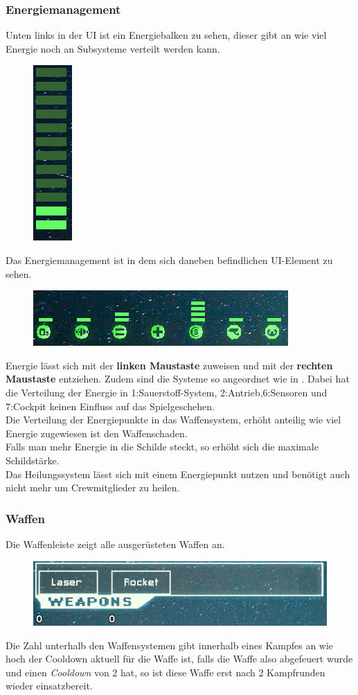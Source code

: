 \documentclass[fontsize=12pt,paper=a4,twoside]{scrartcl}
\begin{document}
\subsubsection{Energiemanagement} \label{sec:Energiemanagement}
Unten links in der UI ist ein Energiebalken zu sehen, dieser gibt an wie viel Energie noch an Subsysteme verteilt werden kann.
\begin{figure}[H]
\centering
\includegraphics[width=0.05\linewidth]{DasSpiel/Ui/power.png}
\end{figure}
Das Energiemanagement ist in dem sich daneben befindlichen UI-Element zu sehen.

\begin{figure}[H]
\centering
\includegraphics[width=0.7\linewidth]{DasSpiel/Ui/systems.png}
\end{figure} 

Energie lässt sich mit der \textbf{linken Maustaste} zuweisen und mit der \textbf{rechten Maustaste} entziehen.
Zudem sind die Systeme so angeordnet wie in . Dabei hat die Verteilung der Energie in 1:Sauerstoff-System, 2:Antrieb,6:Sensoren und 7:Cockpit keinen Einfluss auf das Spielgeschehen.
\\
Die Verteilung der Energiepunkte in das Waffensystem, erhöht anteilig wie viel Energie zugewiesen ist den Waffenschaden.
\\
Falls man mehr Energie in die Schilde steckt, so erhöht sich die maximale Schildstärke.
\\
Das Heilungssystem lässt sich mit einem Energiepunkt nutzen und benötigt auch nicht mehr um Crewmitglieder zu heilen. 

\subsubsection{Waffen}
Die Waffenleiste zeigt alle ausgerüsteten Waffen an.

\begin{figure}[H]
\centering
\includegraphics[width=0.7\linewidth]{DasSpiel/Ui/weapons.png}
\end{figure} 
Die Zahl unterhalb den Waffensystemen gibt innerhalb eines Kampfes an wie hoch der Cooldown aktuell für die Waffe ist, falls die Waffe also abgefeuert wurde und einen \textit{Cooldown} von 2 hat, so ist diese Waffe erst nach 2 Kampfrunden wieder einsatzbereit.
\\
\end{document}

